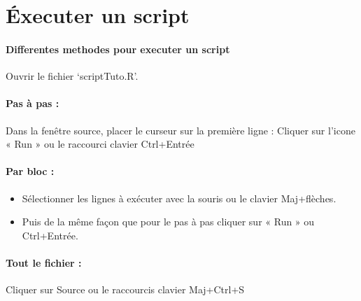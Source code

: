 \section{Éxecuter un script}
\paragraph{Differentes methodes pour executer un script}
Ouvrir le fichier ‘scriptTuto.R'.
\paragraph{Pas à pas :}
Dans la fenêtre source, placer le curseur sur la première ligne :
Cliquer sur l'icone « Run » ou le raccourci clavier Ctrl+Entrée
\paragraph{Par bloc :}
\begin{itemize}
	\item 	Sélectionner les lignes à exécuter avec la souris ou le clavier Maj+flèches.
	\item 	Puis de la même façon que pour le pas à pas cliquer sur « Run » ou Ctrl+Entrée.
\end{itemize}

\paragraph{Tout le fichier :}
	Cliquer sur Source ou le raccourcis clavier Maj+Ctrl+S



